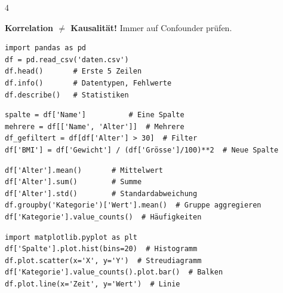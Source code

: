 \begin{landscape}
\begin{multicols*}{4}
		\begin{cheatSheetBox}[title=Merksatz]
			\textbf{Korrelation $\neq$ Kausalität!} Immer auf Confounder prüfen.
		\end{cheatSheetBox}

		\columnbreak


		\begin{cheatSheetBox}[title=CSV laden und inspizieren]
			\begin{lstlisting}
import pandas as pd
df = pd.read_csv('daten.csv')
df.head()       # Erste 5 Zeilen
df.info()       # Datentypen, Fehlwerte
df.describe()   # Statistiken
			\end{lstlisting}
		\end{cheatSheetBox}

		\begin{cheatSheetBox}[title=Spalten filtern und manipulieren]
			\begin{lstlisting}
spalte = df['Name']          # Eine Spalte
mehrere = df[['Name', 'Alter']]  # Mehrere
df_gefiltert = df[df['Alter'] > 30]  # Filter
df['BMI'] = df['Gewicht'] / (df['Grösse']/100)**2  # Neue Spalte
			\end{lstlisting}
		\end{cheatSheetBox}

		\begin{cheatSheetBox}[title=Statistiken und Aggregation]
			\begin{lstlisting}
df['Alter'].mean()       # Mittelwert
df['Alter'].sum()        # Summe
df['Alter'].std()        # Standardabweichung
df.groupby('Kategorie')['Wert'].mean()  # Gruppe aggregieren
df['Kategorie'].value_counts()  # Häufigkeiten
			\end{lstlisting}
		\end{cheatSheetBox}

		\begin{cheatSheetBox}[title=Visualisierung mit matplotlib]
			\begin{lstlisting}
import matplotlib.pyplot as plt
df['Spalte'].plot.hist(bins=20)  # Histogramm
df.plot.scatter(x='X', y='Y')  # Streudiagramm
df['Kategorie'].value_counts().plot.bar()  # Balken
df.plot.line(x='Zeit', y='Wert')  # Linie
			\end{lstlisting}
		\end{cheatSheetBox}



\end{multicols*}
\end{landscape}
